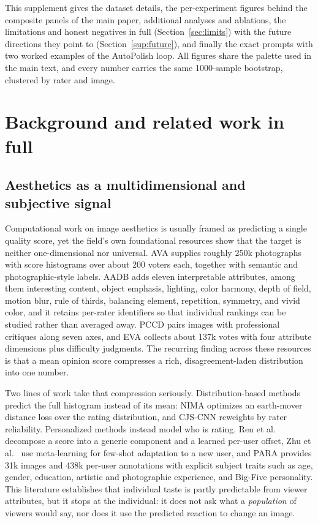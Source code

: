 \documentclass{article}
\begin{document}
This supplement gives the dataset details, the per-experiment figures behind the composite panels of the main paper, additional analyses and ablations, the limitations and honest negatives in full (Section~\ref{sec:limits}) with the future directions they point to (Section~\ref{sup:future}), and finally the exact prompts with two worked examples of the AutoPolish loop. All figures share the palette used in the main text, and every number carries the same 1000-sample bootstrap, clustered by rater and image.

\section{Background and related work in full}
\label{sup:related}

\subsection{Aesthetics as a multidimensional and subjective signal}
Computational work on image aesthetics is usually framed as predicting a single quality score, yet the field's own foundational resources show that the target is neither one-dimensional nor universal. AVA \citep{murray2012ava} supplies roughly 250k photographs with score histograms over about 200 voters each, together with semantic and photographic-style labels. AADB \citep{kong2016aadb} adds eleven interpretable attributes, among them interesting content, object emphasis, lighting, color harmony, depth of field, motion blur, rule of thirds, balancing element, repetition, symmetry, and vivid color, and it retains per-rater identifiers so that individual rankings can be studied rather than averaged away. PCCD \citep{chang2017pccd} pairs images with professional critiques along seven axes, and EVA \citep{kang2020eva} collects about 137k votes with four attribute dimensions plus difficulty judgments. The recurring finding across these resources is that a mean opinion score compresses a rich, disagreement-laden distribution into one number.

Two lines of work take that compression seriously. Distribution-based methods predict the full histogram instead of its mean: NIMA \citep{talebi2018nima} optimizes an earth-mover distance loss over the rating distribution, and CJS-CNN \citep{jin2018cjs} reweights by rater reliability. Personalized methods instead model who is rating. Ren et al.\ \citep{ren2017personalized} decompose a score into a generic component and a learned per-user offset, Zhu et al.\ \citep{zhu2022meta} use meta-learning for few-shot adaptation to a new user, and PARA \citep{yang2022para} provides 31k images and 438k per-user annotations with explicit subject traits such as age, gender, education, artistic and photographic experience, and Big-Five personality. This literature establishes that individual taste is partly predictable from viewer attributes, but it stops at the individual: it does not ask what a \emph{population} of viewers would say, nor does it use the predicted reaction to change an image.
\end{document}

